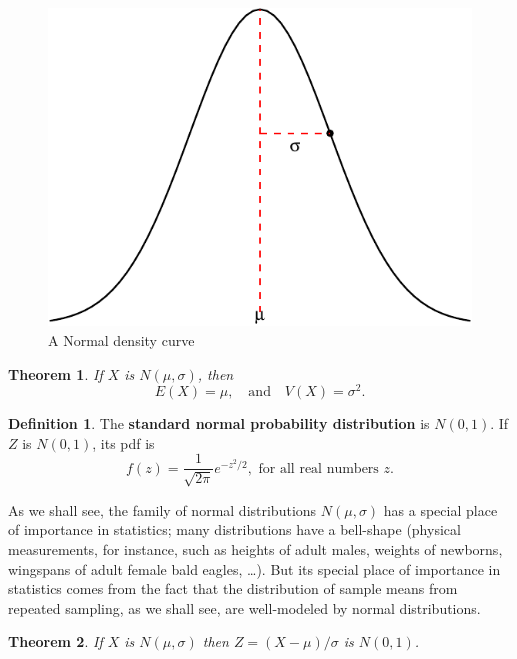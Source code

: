 \documentclass[
]{book}
\newtheorem{theorem}{Theorem}[chapter]
\theoremstyle{definition}
\newtheorem{definition}{Definition}[chapter]
\theoremstyle{definition}
\theoremstyle{definition}
\theoremstyle{definition}
\theoremstyle{remark}
\begin{document}
\begin{figure}
\centering
\includegraphics{math340-notes_files/figure-latex/bell-curve-1.pdf}
\caption{\label{fig:bell-curve}A Normal density curve}
\end{figure}

\begin{theorem}
\protect\hypertarget{thm:normal-EandV}{}\label{thm:normal-EandV}If \(X\) is \(N(\mu,\sigma)\), then \[E(X) = \mu, ~~~ \text{ and } ~~~ V(X) = \sigma^2.\]
\end{theorem}

\begin{definition}
\protect\hypertarget{def:standard-normal}{}\label{def:standard-normal}The \textbf{standard normal probability distribution} is \(N(0,1)\). If \(Z\) is \(N(0,1)\), its pdf is \[f(z) = \frac{1}{\sqrt{2\pi}}e^{-z^2/2}, \text{ for all real numbers } z.\]
\end{definition}

As we shall see, the family of normal distributions \(N(\mu,\sigma)\) has a special place of importance in statistics; many distributions have a bell-shape (physical measurements, for instance, such as heights of adult males, weights of newborns, wingspans of adult female bald eagles, \ldots). But its special place of importance in statistics comes from the fact that the distribution of sample means from repeated sampling, as we shall see, are well-modeled by normal distributions.

\begin{theorem}
\protect\hypertarget{thm:standardizing-normal-distributions}{}\label{thm:standardizing-normal-distributions}If \(X\) is \(N(\mu,\sigma)\) then \(Z = (X-\mu)/\sigma\) is \(N(0,1)\).
\end{theorem}
\end{document}
